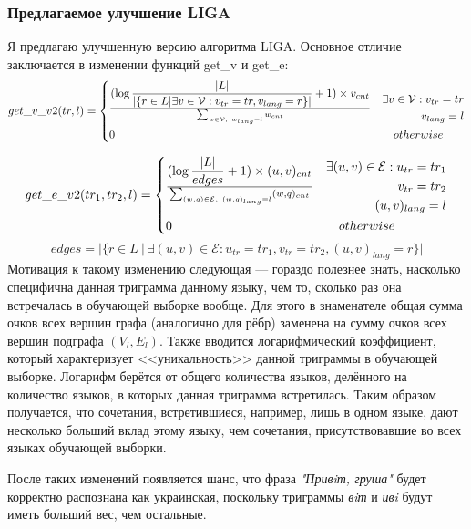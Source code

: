 \documentclass[a4paper, 14pt]{article}
\begin{document}
			\subsubsection{Предлагаемое улучшение LIGA}
			Я предлагаю улучшенную версию алгоритма LIGA. Основное отличие заключается в изменении функций get\_v и get\_e:
			\[
 			get\_v\_v2(tr, l) =
 			  \begin{dcases}
  			   {(\log{|L| \over |\{r \in L | \exists v \in \mathcal{V}: v_{tr}=tr, v_{lang}=r\}|} + 1) \times  v_{cnt}} \over 
  			   \sum_{w \in \mathcal{V},\ w_{lang}=l} w_{cnt} & 
  			   \begin{split} 
						 \exists v \in \mathcal{V}: v_{tr}=tr \\ v_{lang}=l	
  			   	\end{split} \\
  			   0 & \quad otherwise
  			 \end{dcases}
			\]		
		
			\[
 			get\_e\_v2(tr_1, tr_2, l) =
 			  \begin{dcases}
  			   {(\log{|L| \over edges} + 1) \times (u, v)_{cnt}} 
  			   \over \sum_{(w, q) \in \mathcal{E},\ (w, q)_{lang}=l} (w, q)_{cnt} & 
  			    \begin{split} 
						 \exists (u, v) \in \mathcal{E}:  u_{tr}=tr_1 \\ v_{tr}=tr_2 \\ (u, v)_{lang}=l
  			   	\end{split} \\
  			   0 & \quad otherwise
  			 \end{dcases}
			\]	
			$$ edges = |\{r \in L \ | \ \exists (u, v) \in \mathcal{E}: u_{tr}=tr_1, v_{tr}=tr_2, (u, v)_{lang}=r\}| $$
			Мотивация к такому изменению следующая --- гораздо полезнее знать, насколько специфична данная триграмма данному языку, чем то, сколько раз
			 она встречалась в обучающей выборке вообще. Для этого в знаменателе общая сумма очков всех вершин графа (аналогично для рёбр) заменена 
			на сумму очков всех вершин подграфа $(V_{l}, E_{l})$. Также вводится логарифмический коэффициент, который характеризует <<уникальность>> данной триграммы в обучающей выборке. Логарифм берётся от общего количества языков, делённого на количество языков, в которых данная триграмма встретилась. Таким образом получается, что сочетания, встретившиеся, например, лишь в одном языке, дают несколько больший вклад этому языку, чем сочетания, присутствовавшие во всех языках обучающей выборки.
			
			После таких изменений появляется шанс, что фраза \textit{"Привiт, груша"} будет корректно распознана как украинская, поскольку триграммы
			\textit{вiт} и \textit{ивi} будут иметь больший вес, чем остальные.
\end{document}
